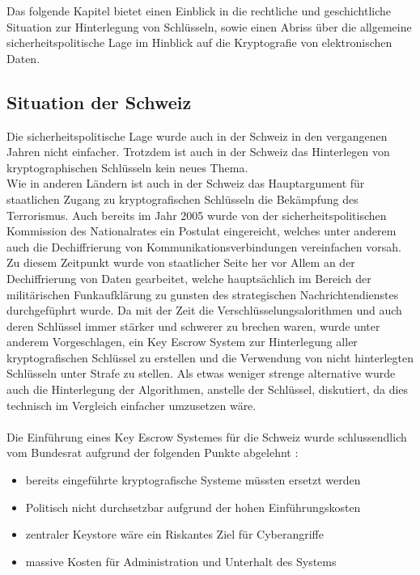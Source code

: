 
Das folgende Kapitel bietet einen Einblick in die rechtliche und geschichtliche Situation zur Hinterlegung von Schlüsseln, sowie einen Abriss über die allgemeine sicherheitspolitische Lage im Hinblick auf die Kryptografie von elektronischen Daten.
	
	
	\subsection{Situation der Schweiz}

Die sicherheitspolitische Lage wurde auch in der Schweiz in den vergangenen Jahren nicht einfacher. Trotzdem ist auch in der Schweiz das Hinterlegen von kryptographischen Schlüsseln kein neues Thema. \\
Wie in anderen Ländern ist auch in der Schweiz das Hauptargument für staatlichen Zugang zu kryptografischen Schlüsseln die Bekämpfung des Terrorismus. Auch bereits im Jahr 2005 wurde von der sicherheitspolitischen Kommission des Nationalrates ein Postulat eingereicht, welches unter anderem auch die Dechiffrierung von Kommunikationsverbindungen vereinfachen vorsah. \cite{adminch} \\ %
Zu diesem Zeitpunkt wurde von staatlicher Seite her vor Allem an der Dechiffrierung von Daten gearbeitet, welche hauptsächlich im Bereich der militärischen Funkaufklärung zu gunsten des strategischen Nachrichtendienstes durchgefüphrt wurde. Da mit der Zeit die Verschlüsselungsalorithmen und auch deren Schlüssel immer stärker und schwerer zu brechen waren, wurde unter anderem Vorgeschlagen, ein Key Escrow System zur Hinterlegung aller kryptografischen Schlüssel zu erstellen und die Verwendung von nicht hinterlegten Schlüsseln unter Strafe zu stellen. Als etwas weniger strenge alternative wurde auch die Hinterlegung der Algorithmen, anstelle der Schlüssel, diskutiert, da dies technisch im Vergleich einfacher umzusetzen wäre. \cite{adminch} \\ 
\\ %
Die Einführung eines Key Escrow Systemes für die Schweiz wurde schlussendlich vom Bundesrat aufgrund der folgenden Punkte abgelehnt \cite{adminch}: %

\begin{itemize}
  \item bereits eingeführte kryptografische Systeme müssten ersetzt werden
  \item Politisch nicht durchsetzbar aufgrund der hohen Einführungskosten
  \item zentraler Keystore wäre ein Riskantes Ziel für Cyberangriffe
  \item massive Kosten für Administration und Unterhalt des Systems
\end{itemize}

